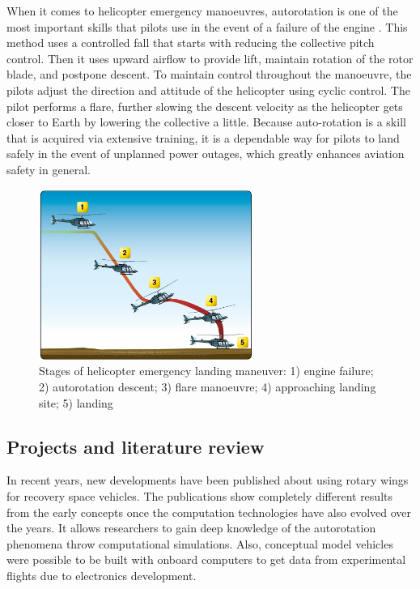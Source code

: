 When it comes to helicopter emergency manoeuvres, autorotation is one of the most important skills that pilots use in the event of a failure of the engine \cite{federal_aviation_administration_helicopter_2021}. This method uses a controlled fall that starts with  reducing the collective pitch control. Then it uses upward airflow to provide lift, maintain rotation of the rotor  blade, and postpone descent. To maintain control throughout the manoeuvre, the pilots adjust the direction  and attitude of the helicopter using cyclic control. The pilot performs a flare, further slowing the descent  velocity as the helicopter gets closer to Earth by lowering the collective a little. Because auto-rotation is a skill
 that is acquired via extensive training, it is a dependable way for pilots to land safely in the event of unplanned power outages, which greatly enhances aviation safety in general.

 \begin{figure}[!htb]
    \centering
    \includegraphics[width=7cm]{Figures/introduction/helicopter maneuver.png}
    \caption{Stages of helicopter emergency landing maneuver: 1) engine failure; 2) autorotation descent; 3) flare manoeuvre; 4) approaching landing site; 5) landing}
    \label{fig:helicopter-maneuver}
\end{figure}

\subsection{Projects and literature review}

In recent years, new developments have been published about using rotary wings for recovery space vehicles. The publications show completely different results from the early concepts once the computation technologies have also evolved over the years. It allows researchers to gain deep knowledge of the autorotation phenomena throw computational simulations. Also, conceptual model vehicles were possible to be built with onboard computers to get data from experimental flights due to electronics development.

